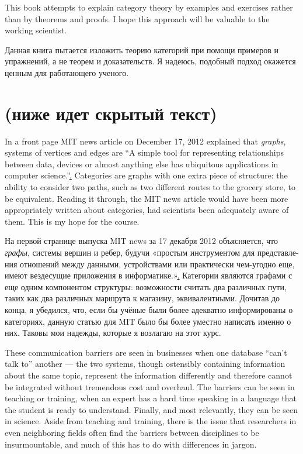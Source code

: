 \documentclass[a4paper]{book}
\theoremstyle{myth}
\begin{document}
\begin{russian}
This book attempts to explain category theory by examples and exercises rather than by theorems and proofs. I hope this approach will be valuable to the working scientist.

Данная книга пытается изложить теорию категорий при помощи примеров и упражнений, а не теорем и доказательств. Я надеюсь, подобный подход окажется ценным для работающего ученого. 


\section{(ниже идет скрытый текст)}

In a front page MIT news article on December 17, 2012 explained that {\em graphs}, systems of vertices and edges are “A simple tool for representing relationships between data, devices or almost anything else has ubiquitous applications in computer science.”\href{http://web.mit.edu/newsoffice/2012/explained-graphs-computer-science-1217.html}. Categories are graphs with one extra piece of structure: the ability to consider two paths, such as two different routes to the grocery store, to be equivalent. Reading it through, the MIT news article would have been more appropriately written about categories, had scientists been adequately aware of them. This is my hope for the course.

На первой странице выпуска MIT news за 17 декабря 2012 объясняется, что {\em графы}, системы вершин и ребер, будучи «простым инструментом для представления отношений между данными, устройствами или практически чем-угодно еще, имеют вездесущие приложения в информатике.»\href{http://web.mit.edu/newsoffice/2012/explained-graphs-computer-science-1217.html}. Категории являются графами с еще одним компонентом структуры: возможности считать два различных пути, таких как два различных маршрута к магазину, эквивалентными. Дочитав до конца, я убедился, что, если бы учёные были более адекватно информированы о категориях, данную статью для MIT было бы более уместно написать именно о них. Таковы мои надежды, которые я возлагаю на этот курс. 

These communication barriers are seen in businesses when one database “can't talk to” another — the two systems, though ostensibly containing information about the same topic, represent the information differently and therefore cannot be integrated without tremendous cost and overhaul. The barriers can be seen in teaching or training, when an expert has a hard time speaking in a language that the student is ready to understand. Finally, and most relevantly, they can be seen in science. Aside from teaching and training, there is the issue that researchers in even neighboring fields often find the barriers between disciplines to be insurmountable, and much of this has to do with differences in jargon.


\end{russian}
\end{document}
